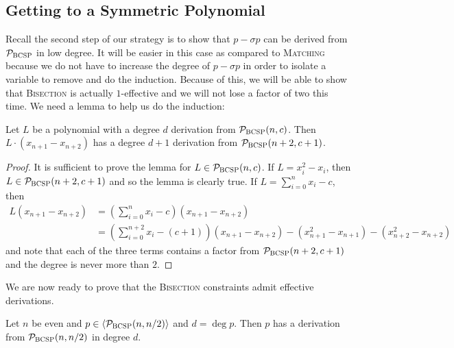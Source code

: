 \subsection{Getting to a Symmetric Polynomial}
Recall the second step of our strategy is to show that $p - \sigma p$ can be derived from $\mathcal P_{\textsc{BCSP}}$ in low degree. It will be easier in this case as compared to \textsc{Matching} because we do not have to increase the degree of $p - \sigma p$ in order to isolate a variable to remove and do the induction. Because of this, we will be able to show that \textsc{Bisection} is actually $1$-effective and we will not lose a factor of two this time.
We need a lemma to help us do the induction:
\begin{lemma}\label{lem:bcsp-induct}
Let $L$ be a polynomial with a degree $d$ derivation from $\mathcal P_{\textsc{BCSP}}(n,c)$. Then $L\cdot (x_{n+1} - x_{n+2})$ has a degree $d+1$ derivation from $\mathcal P_{\textsc{BCSP}}(n+2,c+1)$. 
\end{lemma}
\begin{proof}
It is sufficient to prove the lemma for $L \in \mathcal P_{\textsc{BCSP}}(n,c)$. If $L = x_i^2 - x_i$, then $L \in \mathcal P_{\textsc{BCSP}}(n+2,c+1)$ and so the lemma is clearly true. If $L = \sum_{i=0}^n x_i - c$, then 
\begin{align*}
L(x_{n+1} - x_{n+2}) &= \left(\sum_{i=0}^n x_i - c\right)(x_{n+1} - x_{n+2}) \\
&= \left(\sum_{i=0}^{n+2} x_i - (c+1)\right)(x_{n+1} - x_{n+2}) - (x_{n+1}^2 - x_{n+1}) - (x_{n+2}^2 - x_{n+2})
\end{align*}
and note that each of the three terms contains a factor from $\mathcal P_{\textsc{BCSP}}(n+2,c+1)$ and the degree is never more than $2$. 
\end{proof}
We are now ready to prove that the \textsc{Bisection} constraints admit effective derivations.
\begin{theorem}\label{thm:bisec-effective}
Let $n$ be even and $p \in \langle \mathcal P_{\textsc{BCSP}}(n,n/2) \rangle$ and $d = \deg p$. Then $p$ has a derivation from $\mathcal P_{\textsc{BCSP}}(n,n/2)$ in degree $d$. 
\end{theorem}
